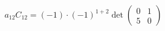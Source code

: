 \documentclass[preview]{standalone}
\begin{document}
\begin{align*}
a_{12}C_{12} = (-1) \cdot (-1)^{1+2} \det\begin{pmatrix} 0 & 1 \\ 5 & 0 \end{pmatrix}
\end{align*}
\end{document}
